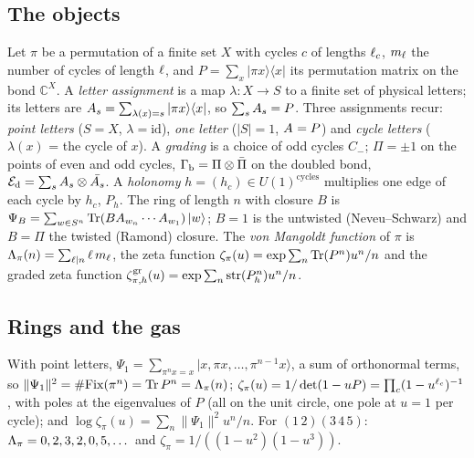 \subsection{The objects}

\begin{definition}
\label{def:graded-permutation-mps}
Let $\pi$ be a permutation of a finite set $X$ with cycles $c$ of lengths $\ell_c$, $m_\ell$ the
number of cycles of length $\ell$, and $P = \sum_x |\pi x\rangle\langle x|$ its permutation
matrix on the bond $\mathbb C^X$. A \emph{letter assignment} is a map $\lambda\colon X\to S$ to a
finite set of physical letters; its letters are $A_{s} = \sum_{\lambda(x) = s}|\pi x\rangle\langle x|$,
so $\sum_sA_{s} = P$. Three assignments recur: \emph{point letters} ($S = X$, $\lambda = \mathrm{id}$),
\emph{one letter} ($|S| = 1$, $A_{} = P$) and \emph{cycle letters} ($\lambda(x)$ = the cycle of $x$).
A \emph{grading} is a choice of odd cycles $C_-$; $\Pi = \pm1$ on the points of even and odd cycles,
$\Gamma_{\mathrm b} = \Pi\otimes\bar\Pi$ on the doubled bond, $\mathcal E_{\mathrm d} = \sum_sA_{s}\otimes\bar{A_{s}}$. A
\emph{holonomy} $h = (h_c)\in U(1)^{\text{cycles}}$ multiplies one edge of each cycle by $h_c$,
$P_h$. The ring of length $n$ with closure $B$ is $\Psi_B = \sum_{w\in S^n}\operatorname{Tr}(BA_{w_n}\cdots
A_{w_1})\,|w\rangle$; $B = 1$ is the untwisted (Neveu--Schwarz) and $B = \Pi$ the twisted
(Ramond) closure. The \emph{von Mangoldt function} of $\pi$ is $\Lambda_\pi(n) =
\sum_{\ell\mid n}\ell\,m_\ell$, the zeta function $\zeta_\pi(u) = \exp\sum_n\operatorname{Tr}(P^n)u^n/n$ and the
graded zeta function $\zeta^{\mathrm{gr}}_{\pi,h}(u) = \exp\sum_n\operatorname{str}(P_h^n)u^n/n$.
\end{definition}

\subsection{Rings and the gas}

\begin{proposition}
\label{prop:permutation-rings}
With point letters, $\Psi_1 = \sum_{\pi^nx = x}|x,\pi x,\dots,\pi^{n-1}x\rangle$, a sum of
orthonormal terms, so $\|\Psi_1\|^2 = \#\mathrm{Fix}(\pi^n) = \operatorname{Tr} P^n = \Lambda_\pi(n)$;
$\zeta_\pi(u) = 1/\det(1-uP) = \prod_c(1-u^{\ell_c})^{-1}$, with poles at the eigenvalues of $P$
(all on the unit circle, one pole at $u = 1$ per cycle); and $\log\zeta_\pi(u) =
\sum_n\|\Psi_1\|^2u^n/n$. For $(1\,2)(3\,4\,5)$: $\Lambda_\pi = 0,2,3,2,0,5,\dots$ and
$\zeta_\pi = 1/((1-u^2)(1-u^3))$.
\end{proposition}

